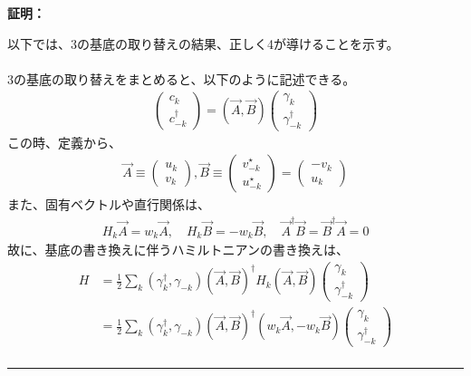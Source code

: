 \documentclass[a4paper,10.5pt]{article}
\numberwithin{equation}{section}
\newenvironment{proofbox}
{\begin{prooflabel}\textbf{証明：}\end{prooflabel}\vspace{0.8em}}
{\par\vspace{1em}\hrule\vspace{1em}}
\begin{document}
\begin{proofbox}
    以下では、3の基底の取り替えの結果、正しく4が導けることを示す。\\
    \\
    3の基底の取り替えをまとめると、以下のように記述できる。
    \begin{align*}
        \begin{pmatrix}
            c_{k} \\ c_{-k}^{\dagger}
        \end{pmatrix}
        =(\vec{A},\vec{B})\begin{pmatrix}
            \gamma_{k} \\ \gamma_{-k}^{\dagger}
        \end{pmatrix}
    \end{align*}
    この時、定義から、
    \begin{align*}
        \vec{A}\equiv \begin{pmatrix}
            u_{k} \\ v_{k}
        \end{pmatrix}, \vec{B}\equiv \begin{pmatrix}
            v^{\star}_{-k} \\ u^{\star}_{-k}
        \end{pmatrix}=\begin{pmatrix}
            -v_{k} \\ u_{k}
        \end{pmatrix}
    \end{align*}
    また、固有ベクトルや直行関係は、
    \begin{align*}
        H_{k}\vec{A}=w_{k}\vec{A},\quad H_{k}\vec{B}=-w_{k}\vec{B},\quad \vec{A}^{\dagger}\vec{B}=\vec{B}^{\dagger}\vec{A}=0
    \end{align*}
    故に、基底の書き換えに伴うハミルトニアンの書き換えは、
    \begin{align*}
        H&=\frac{1}{2}\sum_{k}(\gamma^{\dagger}_{k},\gamma_{-k})(\vec{A},\vec{B})^{\dagger}H_{k}(\vec{A},\vec{B})\begin{pmatrix}
            \gamma_{k} \\ \gamma_{-k}^{\dagger}
        \end{pmatrix}\\
        &=\frac{1}{2}\sum_{k}(\gamma^{\dagger}_{k},\gamma_{-k})(\vec{A},\vec{B})^{\dagger}(w_{k}\vec{A},-w_{k}\vec{B})\begin{pmatrix}
            \gamma_{k} \\ \gamma_{-k}^{\dagger}
        \end{pmatrix}\\

\end{align*}
\end{proofbox}
\end{document}
